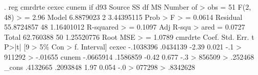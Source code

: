 . reg cmrdrte cexec cunem if d93
{\smallskip}
      Source {\VBAR}       SS           df       MS      Number of
>  obs   =        51
   F(2, 48) 
>        =      2.96
       Model {\VBAR}   6.8879023         2  3.44395115   Prob > F 
>        =    0.0614
    Residual {\VBAR}  55.8724857        48  1.16401012   R-squared
>        =    0.1097
   Adj R-squ
> ared   =    0.0727
       Total {\VBAR}   62.760388        50  1.25520776   Root MSE 
>        =    1.0789
{\smallskip}
     cmrdrte {\VBAR}      Coef.   Std. Err.      t    P>|t|     [9
> 5\% Con                                                    
>       f. Interval]
       cexec {\VBAR}  -.1038396   .0434139    -2.39   0.021    -.1
> 911292                                                    
>            -.01655
       cunem {\VBAR}  -.0665914   .1586859    -0.42   0.677    -.3
> 856509                                                    
>            .252468
       _cons {\VBAR}   .4132665   .2093848     1.97   0.054    -.0
> 077298                                                    
>           .8342628
{\smallskip}
